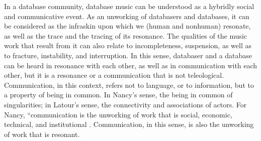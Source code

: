 In a database community, database music can be understood as a hybridly social and communicative event. As an unworking of databasers and databases, it can be considered as the infraskin upon which we (human and nonhuman) resonate, as well as the trace and the tracing of its resonance. The qualities of the music work that result from it can also relate to incompleteness, suspension, as well as to fracture, instability, and interruption. In this sense, databaser and a database can be heard in resonance with each other, as well as in communication with each other, but it is a resonance or a communication that is not teleological. Communication, in this context, refers not to language, or to information, but to a property of being in common. In Nancy's sense, the being in common of singularities; in Latour's sense, the connectivity and associations of actors. For Nancy, ``communication is the unworking of work that is social, economic, technical, and institutional \parencite[31]{Nan91:The}. Communication, in this sense, is also the unworking of work that is resonant. 

